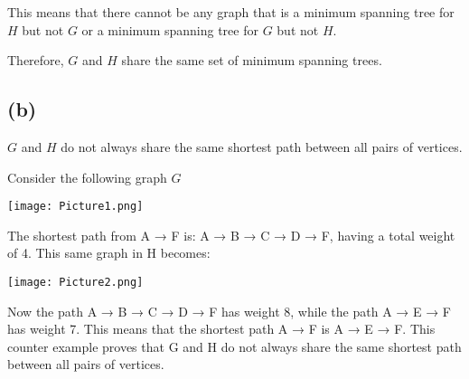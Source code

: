 This means that there cannot be any graph that is a minimum spanning tree for $H$ but not $G$ or a minimum spanning tree for $G$ but not $H$.

Therefore, $G$ and $H$ share the same set of minimum spanning trees.


\subsection*{(b)}

$G$ and $H$ do not always share the same shortest path between all pairs of vertices.

Consider the following graph $G$

\texttt{[image: Picture1.png]}

The shortest path from A → F is: A → B → C → D → F, having a total weight of 4.
This same graph in H becomes:

\texttt{[image: Picture2.png]}

Now the path A → B → C → D → F has weight 8, while the path A → E → F has weight 7. This means that the shortest path A → F is A → E → F. This counter example proves that G and H do not always share the same shortest path between all pairs of vertices.